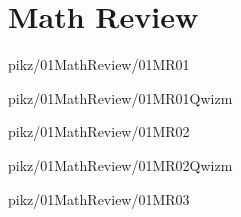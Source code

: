 \documentclass[9pt,xcolor={svgnames, x11names}]{beamer}
\begin{document}

%   


\section{Math Review}


\begin{frame}{pikz/01MathReview/01MR01}
  \resizebox{0.75\textwidth}{!}{%
    
  }
\end{frame}


\begin{frame}{pikz/01MathReview/01MR01Qwizm}
  \resizebox{0.75\textwidth}{!}{%
    
  }
\end{frame}


\begin{frame}{pikz/01MathReview/01MR02}
  \resizebox{0.75\textwidth}{!}{%
    
  }
\end{frame}

\begin{frame}{pikz/01MathReview/01MR02Qwizm}
  \resizebox{0.75\textwidth}{!}{%
    
  }
\end{frame}



\begin{frame}{pikz/01MathReview/01MR03}
  
\end{frame}
\end{document}
